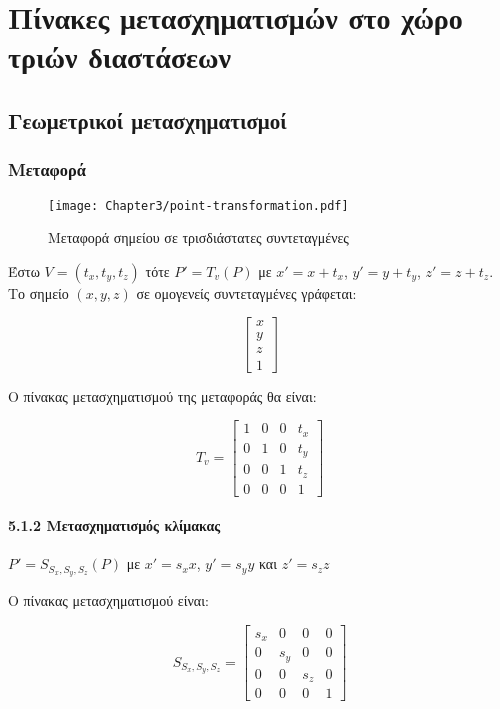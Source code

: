 \chapter{Πίνακες μετασχηματισμών στο χώρο τριών διαστάσεων}

\section{Γεωμετρικοί μετασχηματισμοί}

\subsection{Μεταφορά}

\begin{figure}[hbt]
  \begin{center}
	\texttt{[image: Chapter3/point-transformation.pdf]}
  \end{center}
  \caption{Μεταφορά σημείου σε τρισδιάστατες συντεταγμένες}
\end{figure}



Έστω \( V = (t_x, t_y, t_z) \) τότε \( P' = T_v(P) \) με \( x' = x + t_x \), \( y' = y + t_y \), \( z' = z + t_z \). Το σημείο \((x, y, z)\) σε ομογενείς συντεταγμένες γράφεται:

\[
\begin{bmatrix}
x \\
y \\
z \\
1
\end{bmatrix}
\]

Ο πίνακας μετασχηματισμού της μεταφοράς θα είναι:

\[
T_v =
\begin{bmatrix}
1 & 0 & 0 & t_x \\
0 & 1 & 0 & t_y \\
0 & 0 & 1 & t_z \\
0 & 0 & 0 & 1
\end{bmatrix}
\]

\subsubsection*{5.1.2 Μετασχηματισμός κλίμακας}

\( P' = S_{S_x, S_y, S_z}(P) \) με \( x' = s_x x \), \( y' = s_y y \) και \( z' = s_z z \)

Ο πίνακας μετασχηματισμού είναι:

\[
S_{S_x, S_y, S_z} = 
\begin{bmatrix}
s_x & 0 & 0 & 0 \\
0 & s_y & 0 & 0 \\
0 & 0 & s_z & 0 \\
0 & 0 & 0 & 1
\end{bmatrix}
\]



